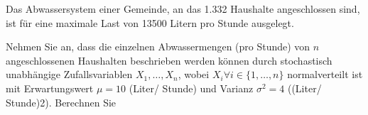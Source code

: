 \documentclass{abgabe}
\begin{document}
\begin{questions}
    \question
    Das Abwassersystem einer Gemeinde, an das 1.332 Haushalte angeschlossen sind, ist für eine maximale Last von 13500 Litern pro Stunde ausgelegt.

    Nehmen Sie an, dass die einzelnen Abwassermengen (pro Stunde) von $n$ angeschlossenen Haushalten beschrieben werden können durch stochastisch unabhängige Zufallsvariablen $X_1, \ldots , X_n$, wobei $X_i \forall i \in \{1, \ldots ,n\}$ normalverteilt ist mit Erwartungswert $\mu = 10$ (Liter/ Stunde) und Varianz $\sigma^2 = 4$ ((Liter/ Stunde)2).
    Berechnen Sie
\end{questions}
\end{document}
